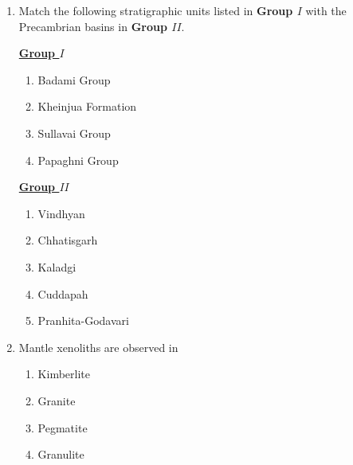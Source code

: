 \documentclass[journal,12pt,onecolumn]{IEEEtran}
\theoremstyle{remark}
\begin{document}
\begin{enumerate}
        \item Match the following stratigraphic units listed in \textbf{Group $I$} with the Precambrian basins in \textbf{Group $II$}. \hfill{}
            \begin{multicols}{2}
                \underline{\textbf{Group $I$}}
                \begin{enumerate}[start =16]
                    \item Badami Group
                    \item Kheinjua Formation
                    \item Sullavai Group
                    \item Papaghni Group
                \end{enumerate}
        
                \columnbreak
        
                \underline{\textbf{Group $II$}}
                \begin{enumerate}
                    \item Vindhyan
                    \item Chhatisgarh
                    \item Kaladgi
                    \item Cuddapah
                    \item Pranhita-Godavari
                \end{enumerate}
            \end{multicols}
            \begin{enumerate}
            \end{enumerate}

        \item Mantle xenoliths are observed in \hfill{}
            \begin{enumerate}                
                    \item Kimberlite
                    \item Granite
                    \item Pegmatite
                    \item Granulite
            \end{enumerate}


\end{enumerate}
\end{document}
